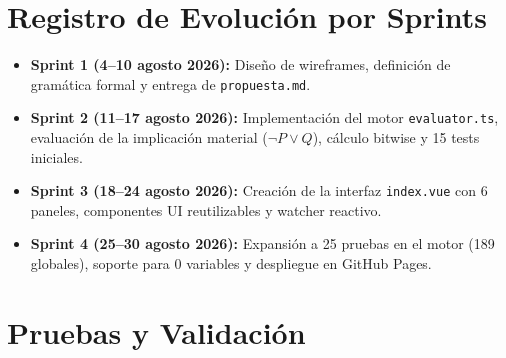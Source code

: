 \documentclass[11pt,a4paper]{article}
\begin{document}
\section{Registro de Evolución por Sprints}

\begin{itemize}[leftmargin=*]
  \item \textbf{Sprint 1 (4--10 agosto 2026):} Diseño de wireframes, definición de gramática formal y entrega de \texttt{propuesta.md}.
  \item \textbf{Sprint 2 (11--17 agosto 2026):} Implementación del motor \texttt{evaluator.ts}, evaluación de la implicación material ($\neg P \lor Q$), cálculo bitwise y 15 tests iniciales.
  \item \textbf{Sprint 3 (18--24 agosto 2026):} Creación de la interfaz \texttt{index.vue} con 6 paneles, componentes UI reutilizables y watcher reactivo.
  \item \textbf{Sprint 4 (25--30 agosto 2026):} Expansión a 25 pruebas en el motor (189 globales), soporte para 0 variables y despliegue en GitHub Pages.
\end{itemize}

\section{Pruebas y Validación}
\end{document}
